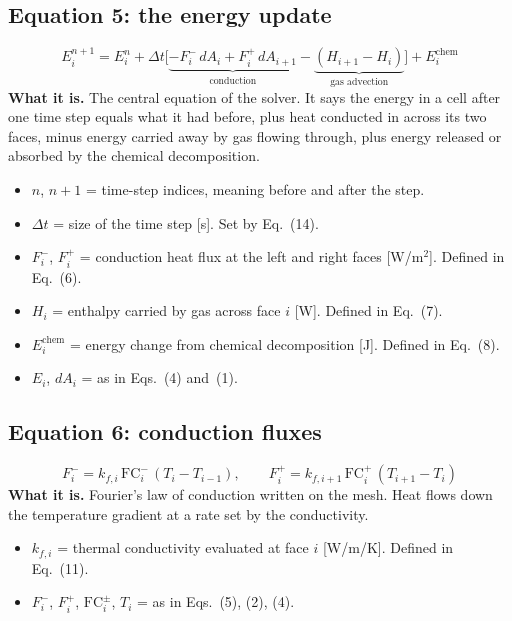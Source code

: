 \documentclass[11pt]{article}
\begin{document}
\subsection*{Equation 5: the energy update}
\begin{equation}
E_i^{n+1} = E_i^{n}
  + \Delta t \Big[ \underbrace{-F^-_i\, dA_i + F^+_i\, dA_{i+1}}_{\text{conduction}}
  - \underbrace{\left(H_{i+1} - H_i\right)}_{\text{gas advection}} \Big]
  + E^{\mathrm{chem}}_i
\end{equation}
\textbf{What it is.} The central equation of the solver. It says the energy in a
cell after one time step equals what it had before, plus heat conducted in across
its two faces, minus energy carried away by gas flowing through, plus energy
released or absorbed by the chemical decomposition.
\begin{itemize}
  \item $n$, $n+1$ = time-step indices, meaning before and after the step.
  \item $\Delta t$ = size of the time step [s]. Set by Eq.~(14).
  \item $F^-_i$, $F^+_i$ = conduction heat flux at the left and right faces
        [W/m$^2$]. Defined in Eq.~(6).
  \item $H_i$ = enthalpy carried by gas across face $i$ [W]. Defined in Eq.~(7).
  \item $E^{\mathrm{chem}}_i$ = energy change from chemical decomposition [J].
        Defined in Eq.~(8).
  \item $E_i$, $dA_i$ = as in Eqs.~(4) and~(1).
\end{itemize}

\subsection*{Equation 6: conduction fluxes}
\begin{equation}
F^-_i = k_{f,i}\,\mathrm{FC}^-_i\,(T_i - T_{i-1}), \qquad
F^+_i = k_{f,i+1}\,\mathrm{FC}^+_i\,(T_{i+1} - T_i)
\end{equation}
\textbf{What it is.} Fourier's law of conduction written on the mesh. Heat flows
down the temperature gradient at a rate set by the conductivity.
\begin{itemize}
  \item $k_{f,i}$ = thermal conductivity evaluated at face $i$ [W/m/K]. Defined
        in Eq.~(11).
  \item $F^-_i$, $F^+_i$, $\mathrm{FC}^\pm_i$, $T_i$ = as in Eqs.~(5), (2), (4).
\end{itemize}
\end{document}
